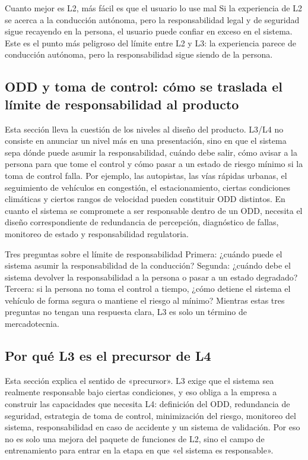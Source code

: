 \begin{warningbox}{Cuanto mejor es L2, más fácil es que el usuario lo use mal}
Si la experiencia de L2 se acerca a la conducción autónoma, pero la responsabilidad legal y de seguridad sigue recayendo en la persona, el usuario puede confiar en exceso en el sistema. Este es el punto más peligroso del límite entre L2 y L3: la experiencia parece de conducción autónoma, pero la responsabilidad sigue siendo de la persona.
\end{warningbox}

\subsection{ODD y toma de control: cómo se traslada el límite de responsabilidad al producto}

Esta sección lleva la cuestión de los niveles al diseño del producto. L3/L4 no consiste en anunciar un nivel más en una presentación, sino en que el sistema sepa dónde puede asumir la responsabilidad, cuándo debe salir, cómo avisar a la persona para que tome el control y cómo pasar a un estado de riesgo mínimo si la toma de control falla. Por ejemplo, las autopistas, las vías rápidas urbanas, el seguimiento de vehículos en congestión, el estacionamiento, ciertas condiciones climáticas y ciertos rangos de velocidad pueden constituir ODD distintos. En cuanto el sistema se compromete a ser responsable dentro de un ODD, necesita el diseño correspondiente de redundancia de percepción, diagnóstico de fallas, monitoreo de estado y responsabilidad regulatoria.

\begin{importantbox}{Tres preguntas sobre el límite de responsabilidad}
Primera: ¿cuándo puede el sistema asumir la responsabilidad de la conducción? Segunda: ¿cuándo debe el sistema devolver la responsabilidad a la persona o pasar a un estado degradado? Tercera: si la persona no toma el control a tiempo, ¿cómo detiene el sistema el vehículo de forma segura o mantiene el riesgo al mínimo? Mientras estas tres preguntas no tengan una respuesta clara, L3 es solo un término de mercadotecnia.
\end{importantbox}

\subsection{Por qué L3 es el precursor de L4}

Esta sección explica el sentido de «precursor». L3 exige que el sistema sea realmente responsable bajo ciertas condiciones, y eso obliga a la empresa a construir las capacidades que necesita L4: definición del ODD, redundancia de seguridad, estrategia de toma de control, minimización del riesgo, monitoreo del sistema, responsabilidad en caso de accidente y un sistema de validación. Por eso no es solo una mejora del paquete de funciones de L2, sino el campo de entrenamiento para entrar en la etapa en que «el sistema es responsable».

